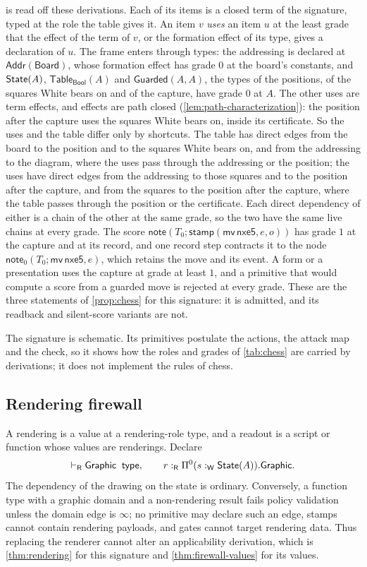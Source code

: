 \documentclass[11pt]{article}
\numberwithin{equation}{section}
\theoremstyle{definition}
\theoremstyle{plain}
\theoremstyle{remark}
\newcommand{\State}{\AFState}
\newcommand{\Graphic}{\mathsf{Graphic}}
\newcommand{\Wit}{\mathsf W}
\newcommand{\Ren}{\mathsf R}
\newcommand{\absent}{\boldsymbol\infty}
\newcommand{\jtype}{\mathrel{\mathsf{type}}}
\begin{document}
 is read off these derivations.  Each of its items is a
closed term of the signature, typed at the role the table gives it.  An item
\(v\) \emph{uses} an item \(u\) at the least grade that the effect of the term
of \(v\), or the formation effect of its type, gives a declaration of \(u\).  The
frame enters through types: the addressing is declared at
\(\mathsf{Addr}(\mathsf{Board})\), whose formation effect has grade \(0\) at
the board's constants, and \(\State(A)\), \(\mathsf{Table}_{\mathsf{Bool}}(A)\)
and \(\mathsf{Guarded}(A,A)\), the types of the positions, of the squares
White bears on and of the capture, have grade \(0\) at \(A\).  The other uses
are term effects, and effects are path closed
(\cref{lem:path-characterization}): the position after the capture uses the
squares White bears on, inside its certificate.  So the uses and the table
differ only by shortcuts.  The table has direct edges from the board to the
position and to the squares White bears on, and from the addressing to the
diagram, where the uses pass through the addressing or the position; the uses
have direct edges from the addressing to those squares and to the position
after the capture, and from the squares to the position after the capture,
where the table passes through the position or the certificate.  Each direct
dependency of either is a chain of the other at the same grade, so the two
have the same live chains at every grade.  The score
\(\mathsf{note}(T_0;\mathsf{stamp}(\mathsf{mv}\,\mathsf{nxe5},e,o))\) has
grade \(1\) at the capture and at its record, and one record step contracts
it to the node \(\mathsf{note}_0(T_0;\mathsf{mv}\,\mathsf{nxe5},e)\), which
retains the move and its event.  A form or a presentation uses the capture at
grade at least \(1\), and a primitive that would compute a score from a
guarded move is rejected at every grade.  These are the three statements of
\cref{prop:chess} for this signature: it is admitted, and its readback and
silent-score variants are not.

The signature is schematic.  Its primitives postulate the actions, the
attack map and the check, so it shows how the roles and grades of
\cref{tab:chess} are carried by derivations; it does not implement the rules
of chess.

\subsection{Rendering firewall}\label{sec:firewall}

A rendering is a value at a rendering-role type, and a readout is a script or
function whose values are renderings.  Declare
\[
  \vdash_{\Ren}\Graphic\;\jtype,
  \qquad
  r:_{\Ren}\AFDepFun^0(s:_{\Wit}\State(A)).\Graphic.
\]
The dependency of the drawing on the state is ordinary.  Conversely, a
function type with a graphic domain and a non-rendering result fails policy
validation unless the domain edge is \(\absent\); no primitive may declare
such an edge, stamps cannot contain rendering payloads, and gates cannot
target rendering data.  Thus replacing the renderer cannot alter an
applicability derivation, which is \cref{thm:rendering} for this signature and
\cref{thm:firewall-values} for its values.
\end{document}
